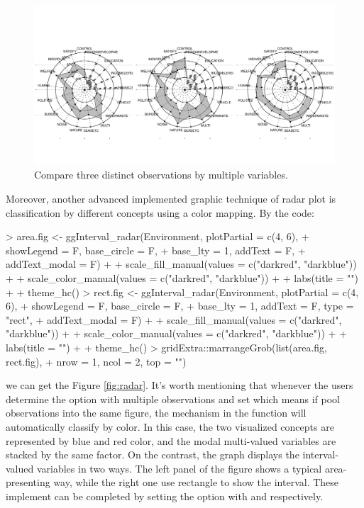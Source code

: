 \documentclass[article]{jss}
\begin{document}
\begin{figure}[htbp]
\centering
\includegraphics[trim=0cm 3cm 0cm 3cm,width=1\textwidth, clip]{radar_3obs.pdf} 
\caption{\label{fig:radar_3obs} Compare three distinct observations by multiple variables.}
\end{figure}

Moreover, another advanced implemented graphic technique of radar plot is classification by different concepts using a color mapping. By the code:
\begin{Schunk}
\begin{Sinput}
> area.fig <- ggInterval_radar(Environment, plotPartial = c(4, 6),
+                              showLegend = F, base_circle = F,
+                              base_lty = 1, addText = F,
+                              addText_modal = F) +
+             scale_fill_manual(values = c("darkred", "darkblue")) +
+             scale_color_manual(values = c("darkred", "darkblue")) +
+             labs(title = "") +
+             theme_hc()
> rect.fig <- ggInterval_radar(Environment, plotPartial = c(4, 6),
+                              showLegend = F, base_circle = F,
+                              base_lty = 1, addText = F, type = "rect",
+                              addText_modal = F) +
+             scale_fill_manual(values = c("darkred", "darkblue")) +
+             scale_color_manual(values = c("darkred", "darkblue")) +
+             labs(title = "") +
+             theme_hc()
> gridExtra::marrangeGrob(list(area.fig, rect.fig), 
+                         nrow = 1, ncol = 2, top = "")
\end{Sinput}
\end{Schunk}

we can get the Figure \ref{fig:radar}. It's worth mentioning that whenever the users determine the option  with multiple observations and set  which means if pool observations into the same figure, the mechanism in the function will automatically classify by color. In this case, the two visualized concepts are represented by blue and red color, and the modal multi-valued variables are stacked by the same factor. On the contrast, the graph displays the interval-valued variables in two ways. The left panel of the figure shows a typical area-presenting way, while the right one use rectangle to show the interval. These implement can be completed by setting the option  with  and  respectively.
\end{document}
